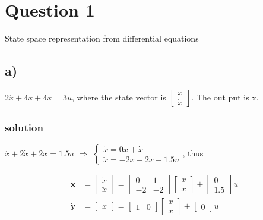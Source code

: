 \section{Question 1}
    State space representation from differential equations

    \subsection{a)} 
    $2\ddot{x} + 4\dot{x} + 4x=3u$, where the state vector is 
    $\begin{bmatrix}
        x \\
        \dot{x}
    \end{bmatrix}$.
    The out put is x.
    \subsubsection{solution}
    $\ddot{x} + 2\dot{x} + 2x=1.5u$ $\Rightarrow$ 
    $\left\{
        \begin{array}{lr}
        \dot{x} = 0x + \dot{x} \\
        \ddot{x} = -2x -2\dot{x} + 1.5u
        \end{array}
    \right.$, thus

    \begin{align}
        \dot{\textbf{x}} &=
        \begin{bmatrix}
            \dot{x} \\
            \ddot{x}
        \end{bmatrix} = 
        \begin{bmatrix}
            0 & 1 \\
            -2 & -2
        \end{bmatrix}
        \begin{bmatrix}
            x \\
            \dot{x}
        \end{bmatrix} + 
        \begin{bmatrix}
            0\\
            1.5
        \end{bmatrix}
        u
        \\
        \dot{\textbf{y}} &=
        \begin{bmatrix}
            x
        \end{bmatrix} =
        \begin{bmatrix}
            1 & 0
        \end{bmatrix}
        \begin{bmatrix}
            x \\
            \dot{x}
        \end{bmatrix} + 
        \begin{bmatrix}
            0
        \end{bmatrix}
        u
    \end{align}

